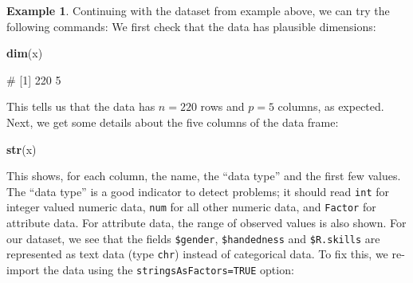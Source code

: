 \documentclass[
  a4paper,
]{article}
\newenvironment{Shaded}{\begin{snugshade}}{\end{snugshade}}
\newcommand{\FunctionTok}[1]{\textcolor[rgb]{0.13,0.29,0.53}{\textbf{#1}}}
\newcommand{\NormalTok}[1]{#1}
\theoremstyle{definition}
\theoremstyle{definition}
\newtheorem{example}{Example}[section]
\theoremstyle{definition}
\theoremstyle{definition}
\theoremstyle{remark}
\begin{document}
\begin{example}
Continuing with the dataset from example above, we can try the following
commands: We first check that the data has plausible dimensions:

\begin{Shaded}
\begin{Highlighting}[]
\FunctionTok{dim}\NormalTok{(x)}
\end{Highlighting}
\end{Shaded}

\begin{Shaded}
\begin{Highlighting}[]
\NormalTok{\# [1] 220   5}
\end{Highlighting}
\end{Shaded}

This tells us that the data has \(n=220\) rows and \(p=5\) columns, as expected.
Next, we get some details about the five columns of the data frame:

\begin{Shaded}
\begin{Highlighting}[]
\FunctionTok{str}\NormalTok{(x)}
\end{Highlighting}
\end{Shaded}

\begin{Shaded}
\end{Shaded}

This shows, for each column, the name, the ``data type'' and the
first few values. The ``data type'' is a good indicator to detect
problems; it should read \texttt{int} for integer valued numeric data,
\texttt{num} for all other numeric data, and \texttt{Factor} for
attribute data. For attribute data, the range of observed values is
also shown. For our dataset, we see that the fields \texttt{\$gender},
\texttt{\$handedness} and \texttt{\$R.skills} are represented as text data (type \texttt{chr})
instead of categorical data. To fix this, we re-import the data
using the \texttt{stringsAsFactors=TRUE} option:


\end{example}
\end{document}
